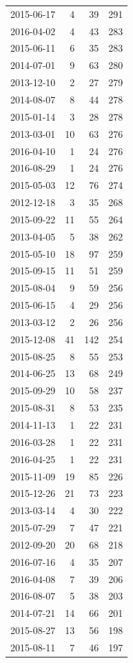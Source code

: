 \begin{tabular}{lrrr}
2015-06-17 & 4 & 39 & 291 \\
2016-04-02 & 4 & 43 & 283 \\
2015-06-11 & 6 & 35 & 283 \\
2014-07-01 & 9 & 63 & 280 \\
2013-12-10 & 2 & 27 & 279 \\
2014-08-07 & 8 & 44 & 278 \\
2015-01-14 & 3 & 28 & 278 \\
2013-03-01 & 10 & 63 & 276 \\
2016-04-10 & 1 & 24 & 276 \\
2016-08-29 & 1 & 24 & 276 \\
2015-05-03 & 12 & 76 & 274 \\
2012-12-18 & 3 & 35 & 268 \\
2015-09-22 & 11 & 55 & 264 \\
2013-04-05 & 5 & 38 & 262 \\
2015-05-10 & 18 & 97 & 259 \\
2015-09-15 & 11 & 51 & 259 \\
2015-08-04 & 9 & 59 & 256 \\
2015-06-15 & 4 & 29 & 256 \\
2013-03-12 & 2 & 26 & 256 \\
2015-12-08 & 41 & 142 & 254 \\
2015-08-25 & 8 & 55 & 253 \\
2014-06-25 & 13 & 68 & 249 \\
2015-09-29 & 10 & 58 & 237 \\
2015-08-31 & 8 & 53 & 235 \\
2014-11-13 & 1 & 22 & 231 \\
2016-03-28 & 1 & 22 & 231 \\
2016-04-25 & 1 & 22 & 231 \\
2015-11-09 & 19 & 85 & 226 \\
2015-12-26 & 21 & 73 & 223 \\
2013-03-14 & 4 & 30 & 222 \\
2015-07-29 & 7 & 47 & 221 \\
2012-09-20 & 20 & 68 & 218 \\
2016-07-16 & 4 & 35 & 207 \\
2016-04-08 & 7 & 39 & 206 \\
2016-08-07 & 5 & 38 & 203 \\
2014-07-21 & 14 & 66 & 201 \\
2015-08-27 & 13 & 56 & 198 \\
2015-08-11 & 7 & 46 & 197 \\

\end{tabular}
